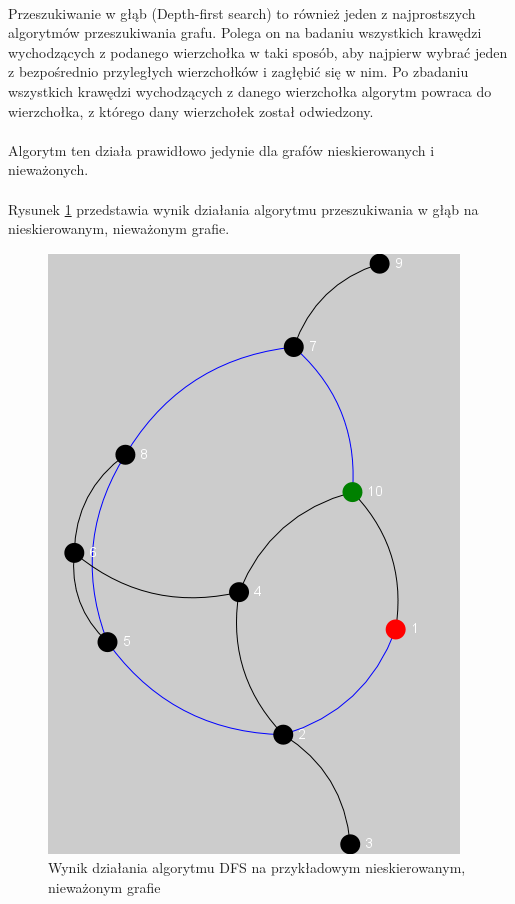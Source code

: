 \paragraph{}
Przeszukiwanie w głąb (Depth-first search) to również jeden z najprostszych algorytmów przeszukiwania grafu. 
Polega on na badaniu wszystkich krawędzi wychodzących z podanego wierzchołka w taki sposób, aby najpierw wybrać jeden z bezpośrednio przyległych
wierzchołków i zagłębić się w nim.
Po zbadaniu wszystkich krawędzi wychodzących z danego wierzchołka algorytm powraca do wierzchołka, z którego dany wierzchołek został odwiedzony.
\paragraph{}
Algorytm ten działa prawidłowo jedynie dla grafów nieskierowanych i nieważonych.

\paragraph{}
Rysunek \ref{fig:dfs} przedstawia wynik działania algorytmu przeszukiwania w głąb na nieskierowanym, nieważonym grafie.

\begin{figure}[!h]
 \centering
 \includegraphics{algorithms/dfs}
 \caption{Wynik działania algorytmu DFS na przykładowym nieskierowanym, nieważonym grafie}
 \label{fig:dfs}
\end{figure}

